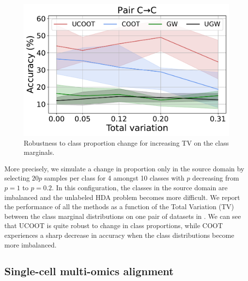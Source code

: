 \begin{figure}
  \centering
  \vspace{-10pt}
  \includegraphics[width=\linewidth]{./Chapitre3/fig/summary_C_C.pdf}
  \vspace*{-7mm}
  \caption{Robustness to class proportion change for increasing TV on the class marginals.
  \label{f:hda_prop}}
\end{figure}
More precisely, we simulate a change in proportion only in the source domain
by selecting $20p$ samples per class for 4 amongst 10 classes with $p$
decreasing from $p=1$ to $p=0.2$. In this configuration,
the classes in the source domain are imbalanced and the unlabeled HDA problem becomes more difficult.
We report the performance of all the methods as a function of the Total Variation (TV)
between the class marginal distributions on one pair of datasets in .
We can see that UCOOT is quite robust to change in class proportions,
while COOT experiences a sharp decrease in accuracy when the class distributions
become more imbalanced.

%
\subsection{Single-cell multi-omics alignment}

